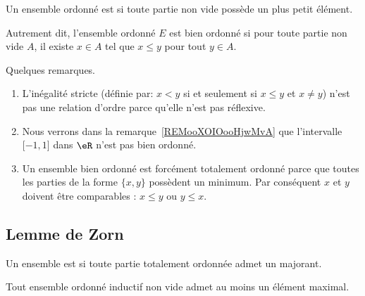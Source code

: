 \begin{definition}   \label{DEFooLJEAooBLGsiS}
	Un ensemble ordonné est  si toute partie non vide possède un plus petit élément.

	Autrement dit, l'ensemble ordonné \( E\) est bien ordonné si pour toute partie non vide \( A\), il existe \( x\in A\) tel que \( x\leq y\) pour tout \( y\in A\).
\end{definition}

\begin{normaltext}  \label{NorooOrdreBienOrdonne}
	Quelques remarques.
	\begin{enumerate}
		\item
		      L'inégalité stricte (définie par: \( x<y\) si et seulement si \( x\leq y\) et \( x\neq y\)) n'est pas une relation d'ordre parce qu'elle n'est pas réflexive.
		\item
		      Nous verrons dans la remarque~\ref{REMooXOIOooHjwMvA}
		      que l'intervalle \( \mathopen[ -1 , 1 \mathclose]\) dans \( \eR\) n'est pas bien ordonné.
		\item
		      Un ensemble bien ordonné est forcément totalement ordonné parce que toutes les parties de la forme \( \{ x,y \}\) possèdent un minimum. Par conséquent \( x\) et \( y\) doivent être comparables : \( x\leq y\) ou \( y\leq x\).
	\end{enumerate}
\end{normaltext}



\subsection{Lemme de Zorn}
\label{SUBooLemmeZorn}



\begin{definition}  \label{DefGHDfyyz}
	Un ensemble est  si toute partie totalement ordonnée admet un majorant.
\end{definition}


\begin{lemma}    \label{LemUEGjJBc}
	Tout ensemble ordonné inductif non vide admet au moins un élément maximal.
\end{lemma}

